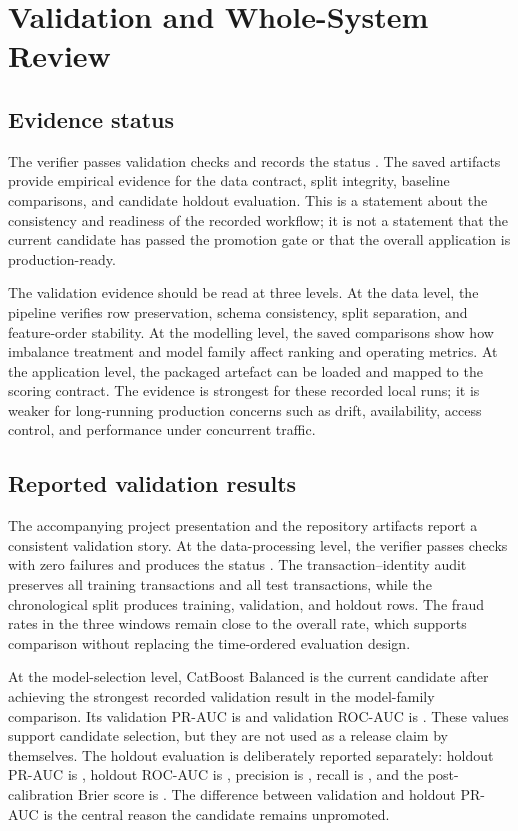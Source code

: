\chapter{Validation and Whole-System Review}
\label{chap:validation}

\section{Evidence status}

The verifier passes  validation checks and records the status
. The saved artifacts provide empirical
evidence for the data contract, split integrity, baseline comparisons, and
candidate holdout evaluation. This is a statement about the consistency and
readiness of the recorded workflow; it is not a statement that the current
candidate has passed the promotion gate or that the overall application is
production-ready.

The validation evidence should be read at three levels. At the data level,
the pipeline verifies row preservation, schema consistency, split separation,
and feature-order stability. At the modelling level, the saved comparisons
show how imbalance treatment and model family affect ranking and operating
metrics. At the application level, the packaged artefact can be loaded and
mapped to the scoring contract. The evidence is strongest for these recorded
local runs; it is weaker for long-running production concerns such as drift,
availability, access control, and performance under concurrent traffic.

\section{Reported validation results}

The accompanying project presentation and the repository artifacts report a
consistent validation story. At the data-processing level, the verifier passes
 checks with zero failures and produces the status
. The transaction--identity audit preserves
all  training transactions and all  test
transactions, while the chronological split produces  training,
 validation, and  holdout rows. The fraud rates in the
three windows remain close to the overall rate, which supports comparison
without replacing the time-ordered evaluation design.

At the model-selection level, CatBoost Balanced is the current candidate after
achieving the strongest recorded validation result in the model-family
comparison. Its validation PR-AUC is  and validation ROC-AUC is
. These values support candidate selection, but they are not used
as a release claim by themselves. The holdout evaluation is deliberately
reported separately: holdout PR-AUC is , holdout ROC-AUC is
, precision is , recall is , and the
post-calibration Brier score is . The difference between validation
and holdout PR-AUC is the central reason the candidate remains unpromoted.

